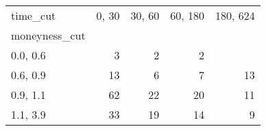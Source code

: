 \begin{tabular}{lrrrr}
\toprule
time\_cut &  0, 30 &  30, 60 &  60, 180 &  180, 624 \\
moneyness\_cut &          &           &            &             \\
\midrule
0.0, 0.6    &        3 &         2 &          2 &             \\
0.6, 0.9    &       13 &         6 &          7 &          13 \\
0.9, 1.1    &       62 &        22 &         20 &          11 \\
1.1, 3.9    &       33 &        19 &         14 &           9 \\
\bottomrule
\end{tabular}
